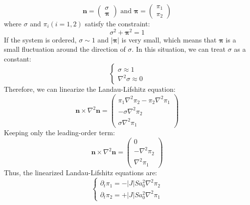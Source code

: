 \begin{equation}
\bm{n} = \begin{pmatrix} \sigma \\ \bm{\pi} \end{pmatrix} \text{ and } \bm{\pi} = \begin{pmatrix} \pi_1 \\ \pi_2 \end{pmatrix}
\end{equation}
where $\sigma$ and $\pi_i (i=1,2)$ satisfy the constraint:
\begin{equation}
\sigma^2 + \bm{\pi}^2 = 1
\end{equation}
If the system is ordered, $\sigma \sim 1$ and $|\bm{\pi}|$ is very small, which means that $\bm{\pi}$ is a small fluctuation around the direction of $\sigma$.
In this situation, we can treat $\sigma$ as a constant:
\begin{equation}
\begin{cases}
\sigma \approx 1 \\
\nabla^2 \sigma \approx 0
\end{cases}
\end{equation}
Therefore, we can linearize the Landau-Lifshitz equation:
\begin{equation}
\bm{n} \times \nabla^2 \bm{n} = \begin{pmatrix} \pi_1 \nabla^2 \pi_2 - \pi_2 \nabla^2 \pi_1 \\ -\sigma \nabla^2 \pi_2 \\ \sigma \nabla^2 \pi_1 \end{pmatrix}
\end{equation}
Keeping only the leading-order term:
\begin{equation}
\bm{n} \times \nabla^2 \bm{n} = \begin{pmatrix} 0 \\ -\nabla^2 \pi_2 \\ \nabla^2 \pi_1 \end{pmatrix}
\end{equation}
Thus, the linearized Landau-Lifshitz equations are:
\begin{equation}
\begin{cases}
\partial_t \pi_1 = -|J|S a_0^2 \nabla^2 \pi_2 \\
\partial_t \pi_2 = +|J|S a_0^2 \nabla^2 \pi_1
\end{cases}
\end{equation}

